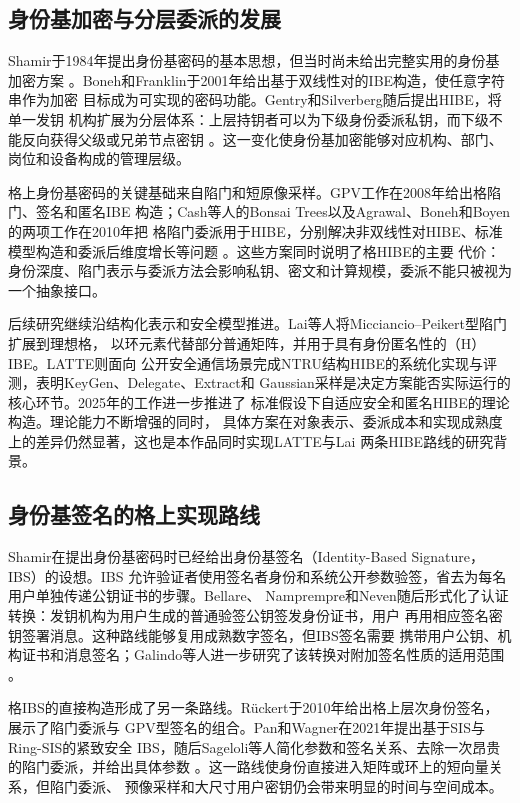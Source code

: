\subsection{身份基加密与分层委派的发展}

Shamir于1984年提出身份基密码的基本思想，但当时尚未给出完整实用的身份基加密方案
\cite{shamir1984}。Boneh和Franklin于2001年给出基于双线性对的IBE构造，使任意字符串作为加密
目标成为可实现的密码功能\cite{bonehfranklin2003}。Gentry和Silverberg随后提出HIBE，将单一发钥
机构扩展为分层体系：上层持钥者可以为下级身份委派私钥，而下级不能反向获得父级或兄弟节点密钥
\cite{gentrysilverberg2002}。这一变化使身份基加密能够对应机构、部门、岗位和设备构成的管理层级。

格上身份基密码的关键基础来自陷门和短原像采样。GPV工作在2008年给出格陷门、签名和匿名IBE
构造\cite{gpv2008}；Cash等人的Bonsai Trees以及Agrawal、Boneh和Boyen的两项工作在2010年把
格陷门委派用于HIBE，分别解决非双线性对HIBE、标准模型构造和委派后维度增长等问题
\cite{cash2010bonsai,agrawal2010hibe,agrawal2010delegation}。这些方案同时说明了格HIBE的主要
代价：身份深度、陷门表示与委派方法会影响私钥、密文和计算规模，委派不能只被视为一个抽象接口。

后续研究继续沿结构化表示和安全模型推进。Lai等人将Micciancio--Peikert型陷门扩展到理想格，
以环元素代替部分普通矩阵，并用于具有身份匿名性的（H）IBE\cite{lai2015trapdoors}。LATTE则面向
公开安全通信场景完成NTRU结构HIBE的系统化实现与评测，表明KeyGen、Delegate、Extract和
Gaussian采样是决定方案能否实际运行的核心环节\cite{zhao2024latte}。2025年的工作进一步推进了
标准假设下自适应安全和匿名HIBE的理论构造\cite{goyal2025adaptivehibe}。理论能力不断增强的同时，
具体方案在对象表示、委派成本和实现成熟度上的差异仍然显著，这也是本作品同时实现LATTE与Lai
两条HIBE路线的研究背景。

\subsection{身份基签名的格上实现路线}

Shamir在提出身份基密码时已经给出身份基签名（Identity-Based Signature，IBS）的设想。IBS
允许验证者使用签名者身份和系统公开参数验签，省去为每名用户单独传递公钥证书的步骤。Bellare、
Namprempre和Neven随后形式化了认证转换：发钥机构为用户生成的普通验签公钥签发身份证书，用户
再用相应签名密钥签署消息\cite{bellare2004ibs}。这种路线能够复用成熟数字签名，但IBS签名需要
携带用户公钥、机构证书和消息签名；Galindo等人进一步研究了该转换对附加签名性质的适用范围
\cite{galindo2006ibs}。

格IBS的直接构造形成了另一条路线。Rückert于2010年给出格上层次身份签名，展示了陷门委派与
GPV型签名的组合\cite{ruckert2010hibs}。Pan和Wagner在2021年提出基于SIS与Ring-SIS的紧致安全
IBS，随后Sageloli等人简化参数和签名关系、去除一次昂贵的陷门委派，并给出具体参数
\cite{pan2021ibs,sageloli2023ibs}。这一路线使身份直接进入矩阵或环上的短向量关系，但陷门委派、
预像采样和大尺寸用户密钥仍会带来明显的时间与空间成本。

